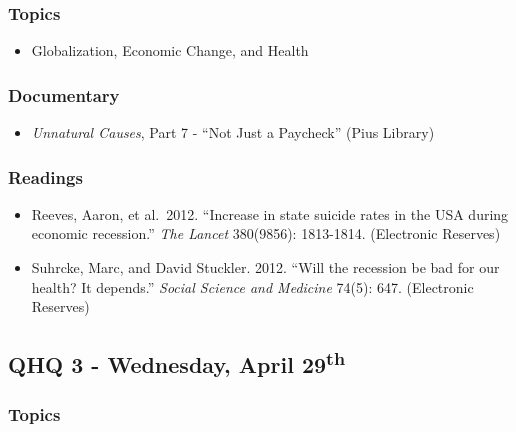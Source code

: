 \documentclass[]{book}
\providecommand{\tightlist}{%
  \setlength{\itemsep}{0pt}\setlength{\parskip}{0pt}}
\begin{document}
\hypertarget{topics-28}{%
\subsubsection*{Topics}\label{topics-28}}

\begin{itemize}
\tightlist
\item
  Globalization, Economic Change, and Health
\end{itemize}

\hypertarget{documentary-4}{%
\subsubsection*{Documentary}\label{documentary-4}}

\begin{itemize}
\tightlist
\item
  \emph{Unnatural Causes}, Part 7 - ``Not Just a Paycheck'' (Pius Library)
\end{itemize}

\hypertarget{readings-26}{%
\subsubsection*{Readings}\label{readings-26}}

\begin{itemize}
\tightlist
\item
  Reeves, Aaron, et al.~2012. ``Increase in state suicide rates in the USA during economic recession.'' \emph{The Lancet} 380(9856): 1813-1814. (Electronic Reserves)
\item
  Suhrcke, Marc, and David Stuckler. 2012. ``Will the recession be bad for our health? It depends.'' \emph{Social Science and Medicine} 74(5): 647. (Electronic Reserves)
\end{itemize}

\hypertarget{qhq-3---wednesday-april-29th}{%
\subsection*{\texorpdfstring{QHQ 3 - Wednesday, April 29\textsuperscript{th}}{QHQ 3 - Wednesday, April 29th}}\label{qhq-3---wednesday-april-29th}}

\hypertarget{topics-29}{%
\subsubsection*{Topics}\label{topics-29}}
\end{document}
